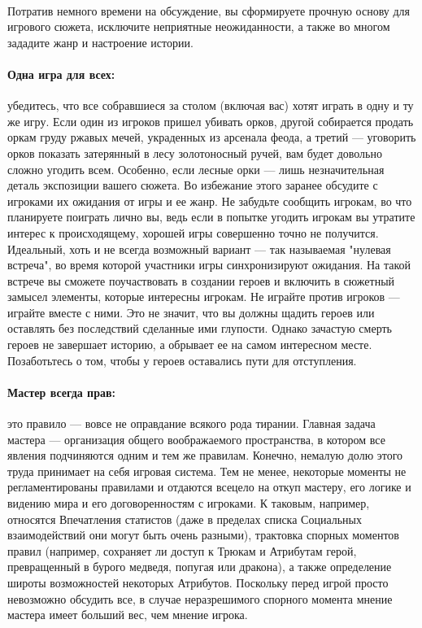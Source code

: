 \paragraph{}
Потратив немного времени на обсуждение, вы сформируете прочную основу для игрового сюжета, исключите неприятные
неожиданности, а также во многом зададите жанр и настроение
истории.
\paragraph{Одна игра для всех:} убедитесь, что все собравшиеся за столом (включая вас) хотят играть в одну и ту же игру. Если один из игроков пришел убивать орков, другой собирается продать оркам груду ржавых мечей, украденных из арсенала феода, а третий — уговорить орков показать затерянный в лесу золотоносный ручей, вам будет довольно сложно угодить всем. Особенно, если лесные орки — лишь незначительная деталь экспозиции вашего сюжета.
\newline
Во избежание этого заранее обсудите с игроками их ожидания
от игры и ее жанр. Не забудьте сообщить игрокам, во что планируете
поиграть лично вы, ведь если в попытке угодить игрокам вы утратите интерес к происходящему, хорошей игры совершенно точно не получится. Идеальный, хоть и не всегда возможный вариант — так называемая "нулевая встреча", во время которой участники игры синхронизируют ожидания. На такой встрече вы сможете поучаствовать в создании героев и включить в сюжетный замысел элементы, которые интересны игрокам.
\newline
Не играйте против игроков — играйте вместе с ними. Это
не значит, что вы должны щадить героев или оставлять без
последствий сделанные ими глупости. Однако зачастую смерть
героев не завершает историю, а обрывает ее на самом интересном
месте. Позаботьтесь о том, чтобы у героев оставались пути для
отступления.
\paragraph{Мастер всегда прав:} это правило — вовсе не оправдание всякого рода тирании. Главная задача мастера — организация общего воображаемого пространства, в котором все явления подчиняются одним и тем же правилам. Конечно, немалую долю этого труда принимает на себя игровая система. Тем не менее, некоторые моменты не регламентированы правилами и отдаются всецело на откуп мастеру, его логике и видению мира и его договоренностям с игроками. К таковым, например, относятся Впечатления статистов (даже в пределах списка Социальных взаимодействий они могут быть очень разными), трактовка спорных моментов правил (например, сохраняет ли доступ к Трюкам и Атрибутам герой, превращенный в бурого медведя, попугая или дракона), а также определение широты возможностей некоторых Атрибутов. Поскольку перед игрой просто невозможно обсудить все, в случае неразрешимого спорного момента мнение мастера имеет больший вес, чем мнение игрока.
